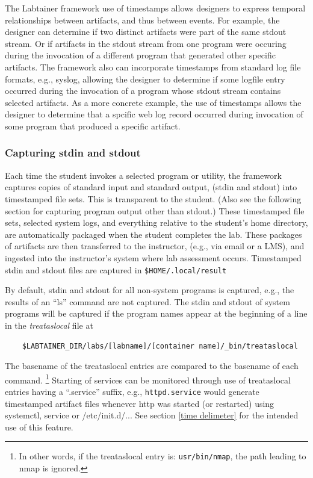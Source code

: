 \documentclass[12pt]{article}
\begin{document}
The Labtainer framework use of timestamps allows designers to express temporal 
relationships between artifacts, and thus between events.  For example, the designer can determine if
two distinct artifacts were part of the same stdout stream.  Or if artifacts in the stdout stream from one 
program were occuring during the invocation of a different program that generated other specific artifacts.  
The framework also can incorporate
timestamps from standard log file formats, e.g., syslog, allowing the designer to determine if some logfile
entry occurred during the invocation of a program whose stdout stream contains selected artifacts.
As a more concrete example, the use of timestamps allows the designer to determine that a spcific web log
record occurred during invocation of some program that produced a specific artifact.

\subsubsection{Capturing stdin and stdout}
\label{stdin and stdout}
Each time the student invokes a selected program or utility, the 
framework captures copies of standard input and standard output, (stdin and stdout) into timestamped file sets.
This is transparent to the student.  (Also see the following section for capturing
program output other than stdout.)  These timestamped file sets, selected system logs,  and everything relative to
the student's home directory, are automatically packaged when the student completes the lab.
These packages of artifacts are then transferred to the instructor, (e.g., via email or a LMS), and 
ingested into the instructor's system where lab assessment occurs. Timestamped stdin and stdout files
are captured in \texttt{\$HOME/.local/result}

By default, stdin and stdout for all non-system programs is captured, e.g., the results of an ``ls'' command
are not captured.  The stdin and stdout of system programs will be captured if the program
names appear at the beginning of a line in the \textit{treataslocal} file at
\begin{verbatim}
    $LABTAINER_DIR/labs/[labname]/[container name]/_bin/treataslocal
\end{verbatim}
\noindent The basename of the treataslocal entries are compared to the basename of each command.
\footnote{In other words, if the treataslocal entry is: \texttt{usr/bin/nmap}, the path leading to nmap is ignored.}
Starting of services can be monitored through use of treataslocal entries having a ``.service'' suffix,
e.g., {\tt httpd.service} would generate timestamped artifact files whenever http was started (or restarted)
using systemctl, service or /etc/init.d/...  See section \ref{time delimeter} for the intended use of this feature.
\end{document}
